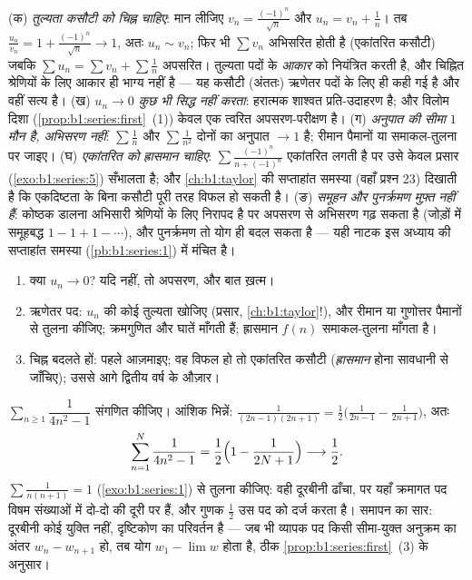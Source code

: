 \begin{remark}[श्रेणियों की सामान्य भूलें]
(क) \emph{तुल्यता कसौटी को चिह्न चाहिए}: मान लीजिए $v_n =
\frac{(-1)^n}{\sqrt n}$ और $u_n = v_n + \frac1n$। तब $\frac{u_n}{v_n} = 1 +
\frac{(-1)^n}{\sqrt n} \to 1$, अतः $u_n \sim v_n$; फिर भी $\sum v_n$ अभिसरित
होती है (एकांतरित कसौटी) जबकि $\sum u_n = \sum v_n + \sum \frac1n$ अपसरित।
तुल्यता पदों के \emph{आकार} को नियंत्रित करती है, और चिह्नित श्रेणियों के
लिए आकार ही भाग्य नहीं है --- यह कसौटी (अंततः) ऋणेतर पदों के लिए ही कही गई
है और वहीं सत्य है। (ख) \emph{$u_n \to 0$ कुछ भी सिद्ध नहीं करता}: हरात्मक
 शाश्वत प्रति-उदाहरण है; और विलोम दिशा
(\cref{prop:b1:series:first}~(1)) केवल एक त्वरित अपसरण-परीक्षण है। (ग)
\emph{अनुपात की सीमा $1$ मौन है, अभिसरण नहीं}: $\sum\frac1n$ और
$\sum\frac{1}{n^2}$ दोनों का अनुपात $\to 1$ है; रीमान पैमानों या समाकल-तुलना
पर जाइए। (घ) \emph{एकांतरित को ह्रासमान चाहिए}: $\sum \frac{(-1)^n}{n +
(-1)^n}$ एकांतरित लगती है पर उसे केवल प्रसार (\cref{exo:b1:series:5})
सँभालता है; और \cref{ch:b1:taylor} की सप्ताहांत समस्या (वहाँ प्रश्न 23)
दिखाती है कि एकदिष्टता के बिना कसौटी पूरी तरह विफल हो सकती है। (ङ)
\emph{समूहन और पुनर्क्रमण मुफ़्त नहीं हैं}: कोष्ठक डालना अभिसारी श्रेणियों
के लिए निरापद है पर अपसरण से अभिसरण गढ़ सकता है (जोड़ों में समूहबद्ध $1 - 1
+ 1 - \cdots$), और पुनर्क्रमण तो योग ही बदल सकता है --- यही नाटक इस अध्याय
की सप्ताहांत समस्या (\cref{pb:b1:series:1}) में मंचित है।
\end{remark}

\begin{method}[किसी श्रेणी की प्रकृति तय करना]\label{met:b1:series:decide}
\begin{enumerate}
  \item क्या $u_n \to 0$? यदि नहीं, तो अपसरण, और बात ख़त्म।
  \item ऋणेतर पद: $u_n$ की कोई तुल्यता खोजिए (प्रसार, \cref{ch:b1:taylor}!),
  और रीमान या गुणोत्तर पैमानों से तुलना कीजिए; क्रमगुणित और घातें  माँगती हैं; ह्रासमान $f(n)$ समाकल-तुलना माँगता है।
  \item चिह्न बदलते हों: पहले  आज़माइए; वह विफल हो तो
  एकांतरित कसौटी (\emph{ह्रासमान} होना सावधानी से जाँचिए); उससे आगे द्वितीय
  वर्ष के औज़ार।
\end{enumerate}
\end{method}

\begin{example}[विषम हर, आधी दूरबीन]\label{ex:b1:series:oddtelescope}
$\sum_{n \geq 1} \dfrac{1}{4n^2 - 1}$ संगणित कीजिए। आंशिक भिन्नें:
$\frac{1}{(2n-1)(2n+1)} = \frac12\bigl(\frac{1}{2n-1} -
\frac{1}{2n+1}\bigr)$, अतः
\[
\sum_{n=1}^{N} \frac{1}{4n^2 - 1}
= \frac12\Bigl(1 - \frac{1}{2N+1}\Bigr)
\longrightarrow \frac12 .
\]
$\sum \frac{1}{n(n+1)} = 1$ (\cref{exo:b1:series:1}) से तुलना कीजिए: वही
दूरबीनी ढाँचा, पर यहाँ क्रमागत पद विषम संख्याओं में दो-दो की दूरी पर हैं, और
गुणक $\frac12$ उस पद को दर्ज करता है। समापन का सार: दूरबीनी कोई युक्ति नहीं,
दृष्टिकोण का परिवर्तन है --- जब भी व्यापक पद किसी सीमा-युक्त अनुक्रम का अंतर
$w_n - w_{n+1}$ हो, तब योग $w_1 - \lim w$ होता है, ठीक
\cref{prop:b1:series:first}~(3) के अनुसार।
\end{example}

